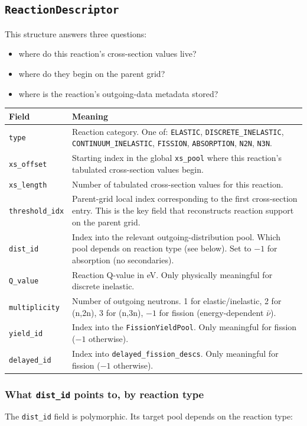 \documentclass[11pt,a4paper]{article}
\begin{document}
\subsection{\texttt{ReactionDescriptor}}
This structure answers three questions:
\begin{itemize}[leftmargin=1.4em]
  \item where do this reaction's cross-section values live?
  \item where do they begin on the parent grid?
  \item where is the reaction's outgoing-data metadata stored?
\end{itemize}

\begin{longtable}{p{2.4cm} p{9.9cm}}
\toprule
Field & Meaning \\
\midrule
\texttt{type} & Reaction category. One of: \texttt{ELASTIC}, \texttt{DISCRETE\_INELASTIC}, \texttt{CONTINUUM\_INELASTIC}, \texttt{FISSION}, \texttt{ABSORPTION}, \texttt{N2N}, \texttt{N3N}. \\
\texttt{xs\_offset} & Starting index in the global \texttt{xs\_pool} where this reaction's tabulated cross-section values begin. \\
\texttt{xs\_length} & Number of tabulated cross-section values for this reaction. \\
\texttt{threshold\_idx} & Parent-grid local index corresponding to the first cross-section entry. This is the key field that reconstructs reaction support on the parent grid. \\
\texttt{dist\_id} & Index into the relevant outgoing-distribution pool. Which pool depends on reaction type (see below). Set to $-1$ for absorption (no secondaries). \\
\texttt{Q\_value} & Reaction Q-value in eV. Only physically meaningful for discrete inelastic. \\
\texttt{multiplicity} & Number of outgoing neutrons. 1 for elastic/inelastic, 2 for (n,2n), 3 for (n,3n), $-1$ for fission (energy-dependent $\bar\nu$). \\
\texttt{yield\_id} & Index into the \texttt{FissionYieldPool}. Only meaningful for fission ($-1$ otherwise). \\
\texttt{delayed\_id} & Index into \texttt{delayed\_fission\_descs}. Only meaningful for fission ($-1$ otherwise). \\
\bottomrule
\end{longtable}

\subsubsection{What \texttt{dist\_id} points to, by reaction type}
The \texttt{dist\_id} field is polymorphic. Its target pool depends on the reaction type:
\end{document}

